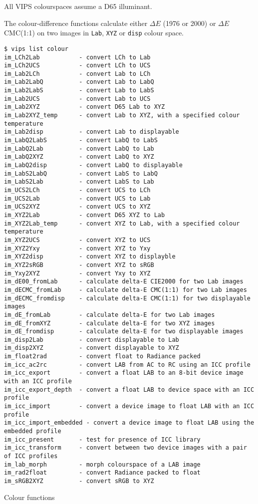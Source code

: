 All VIPS colourspaces assume a D65 illuminant.

The colour-difference functions calculate either $\Delta{}E$ \cielab{} (1976
or 2000) or $\Delta{}E$ CMC(1:1) on two images in \verb+Lab+, \verb+XYZ+ 
or \verb+disp+ colour space.

\begin{fig2}
\begin{verbatim}
$ vips list colour
im_LCh2Lab           - convert LCh to Lab
im_LCh2UCS           - convert LCh to UCS
im_Lab2LCh           - convert Lab to LCh
im_Lab2LabQ          - convert Lab to LabQ
im_Lab2LabS          - convert Lab to LabS
im_Lab2UCS           - convert Lab to UCS
im_Lab2XYZ           - convert D65 Lab to XYZ
im_Lab2XYZ_temp      - convert Lab to XYZ, with a specified colour temperature
im_Lab2disp          - convert Lab to displayable
im_LabQ2LabS         - convert LabQ to LabS
im_LabQ2Lab          - convert LabQ to Lab
im_LabQ2XYZ          - convert LabQ to XYZ
im_LabQ2disp         - convert LabQ to displayable
im_LabS2LabQ         - convert LabS to LabQ
im_LabS2Lab          - convert LabS to Lab
im_UCS2LCh           - convert UCS to LCh
im_UCS2Lab           - convert UCS to Lab
im_UCS2XYZ           - convert UCS to XYZ
im_XYZ2Lab           - convert D65 XYZ to Lab
im_XYZ2Lab_temp      - convert XYZ to Lab, with a specified colour temperature
im_XYZ2UCS           - convert XYZ to UCS
im_XYZ2Yxy           - convert XYZ to Yxy
im_XYZ2disp          - convert XYZ to displayble
im_XYZ2sRGB          - convert XYZ to sRGB
im_Yxy2XYZ           - convert Yxy to XYZ
im_dE00_fromLab      - calculate delta-E CIE2000 for two Lab images
im_dECMC_fromLab     - calculate delta-E CMC(1:1) for two Lab images
im_dECMC_fromdisp    - calculate delta-E CMC(1:1) for two displayable images
im_dE_fromLab        - calculate delta-E for two Lab images
im_dE_fromXYZ        - calculate delta-E for two XYZ images
im_dE_fromdisp       - calculate delta-E for two displayable images
im_disp2Lab          - convert displayable to Lab
im_disp2XYZ          - convert displayable to XYZ
im_float2rad         - convert float to Radiance packed
im_icc_ac2rc         - convert LAB from AC to RC using an ICC profile
im_icc_export        - convert a float LAB to an 8-bit device image with an ICC profile
im_icc_export_depth  - convert a float LAB to device space with an ICC profile
im_icc_import        - convert a device image to float LAB with an ICC profile
im_icc_import_embedded - convert a device image to float LAB using the embedded profile
im_icc_present       - test for presence of ICC library
im_icc_transform     - convert between two device images with a pair of ICC profiles
im_lab_morph         - morph colourspace of a LAB image
im_rad2float         - convert Radiance packed to float
im_sRGB2XYZ          - convert sRGB to XYZ
\end{verbatim}
\caption{Colour functions}
\label{fg:colour}
\end{fig2}


